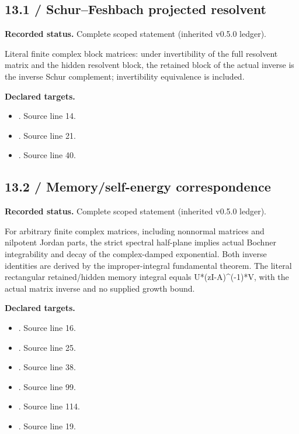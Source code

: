 \subsection{13.1 / Schur--Feshbach projected resolvent}
\label{result:13.1}
\textbf{Recorded status.} Complete scoped statement (inherited v0.5.0 ledger).\par
Literal finite complex block matrices: under invertibility of the full resolvent matrix and the hidden resolvent block, the retained block of the actual inverse is the inverse Schur complement; invertibility equivalence is included.

\textbf{Declared targets.}\begin{itemize}
\item {}. Source line 14.
\item {}. Source line 21.
\item {}. Source line 40.
\end{itemize}
\subsection{13.2 / Memory/self-energy correspondence}
\label{result:13.2}
\textbf{Recorded status.} Complete scoped statement (inherited v0.5.0 ledger).\par
For arbitrary finite complex matrices, including nonnormal matrices and nilpotent Jordan parts, the strict spectral half-plane implies actual Bochner integrability and decay of the complex-damped exponential. Both inverse identities are derived by the improper-integral fundamental theorem. The literal rectangular retained/hidden memory integral equals U*(zI-A)\textasciicircum{}(-1)*V, with the actual matrix inverse and no supplied growth bound.

\textbf{Declared targets.}\begin{itemize}
\item {}. Source line 16.
\item {}. Source line 25.
\item {}. Source line 38.
\item {}. Source line 99.
\item {}. Source line 114.
\item {}. Source line 19.
\end{itemize}
